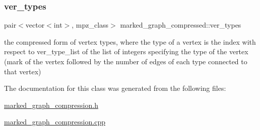 \subsubsection{\texorpdfstring{ver\+\_\+types}{ver\_types}}
{\footnotesize\ttfamily pair$<$vector$<$int$>$, mpz\+\_\+class$>$ marked\+\_\+graph\+\_\+compressed\+::ver\+\_\+types}



the compressed form of vertex types, where the type of a vertex is the index with respect to ver\+\_\+type\+\_\+list of the list of integers specifying the type of the vertex (mark of the vertex followed by the number of edges of each type connected to that vertex) 



The documentation for this class was generated from the following files\+:\begin{DoxyCompactItemize}
\item 
\hyperlink{marked__graph__compression_8h}{marked\+\_\+graph\+\_\+compression.\+h}\item 
\hyperlink{marked__graph__compression_8cpp}{marked\+\_\+graph\+\_\+compression.\+cpp}\end{DoxyCompactItemize}
